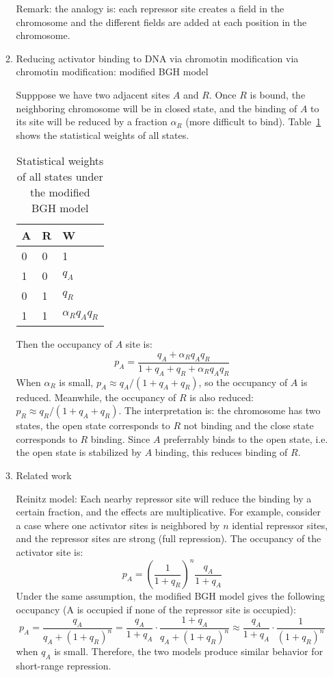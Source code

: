 \documentclass[11pt]{article}
\begin{document}
\begin{enumerate}
\begin{enumerate}
Remark: the analogy is: each repressor site creates a field in the chromosome and the different fields are added at each position in the chromosome. 

\item{Reducing activator binding to DNA via chromotin modification via chromotin modification: modified BGH model}

Supppose we have two adjacent sites $A$ and $R$. Once $R$ is bound, the neighboring chromosome will be in closed state, and the binding of $A$ to its site will be reduced by a fraction $\alpha_R$ (more difficult to bind). Table~\ref{tab:short-range-repr} shows the statistical weights of all states. 

\begin{table}[h]
	\centering
		\begin{tabular}{ll|l}
			\hline
			A & R & W \\
			\hline
			0 & 0 & 1\\
			1 & 0 & $q_A$\\
			0 & 1 & $q_R$\\
			1 & 1 & $\alpha_R q_A q_R$\\
			\hline
		\end{tabular}
		\caption{Statistical weights of all states under the modified BGH model}
		\label{tab:short-range-repr}
\end{table}

Then the occupancy of $A$ site is: 
\begin{equation}
p_A = \frac{q_A + \alpha_R q_A q_R}{1 + q_A + q_R + \alpha_R q_A q_R}
\end{equation}   
When $\alpha_R$ is small, $p_A \approx q_A / (1+ q_A + q_R)$, so the occupancy of $A$ is reduced. Meanwhile, the occupancy of $R$ is also reduced: $p_R \approx q_R / (1+ q_A + q_R)$. The interpretation is: the chromosome has two states, the open state corresponds to $R$ not binding and the close state corresponds to $R$ binding. Since $A$ preferrably binds to the open state, i.e. the open state is stabilized by $A$ binding, this reduces binding of $R$. 

\item{Related work}

Reinitz model: Each nearby repressor site will reduce the binding by a certain fraction, and the effects are multiplicative. For example, consider a case where one activator sites is neighbored by $n$ idential repressor sites, and the repressor sites are strong (full repression). The occupancy of the activator site is: 
\begin{equation}
p_A = \left( \frac{1}{1+q_R} \right)^n \frac{q_A}{1+q_A}
\end{equation}
Under the same assumption, the modified BGH model gives the following occupancy (A is occupied if none of the repressor site is occupied): 
\begin{equation}
p_A = \frac{q_A}{q_A + (1 + q_R)^n} = \frac{q_A}{1+q_A} \cdot \frac{1 + q_A}{q_A + (1+q_R)^n} \approx \frac{q_A}{1+q_A} \cdot \frac{1}{(1+q_R)^n} 
\end{equation}
when $q_A$ is small. Therefore, the two models produce similar behavior for short-range repression. 


\end{enumerate}
\end{enumerate}
\end{document}
